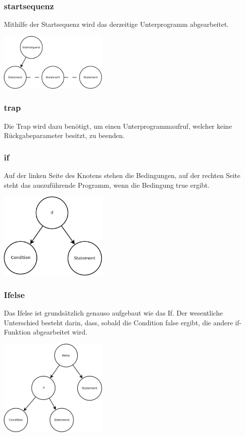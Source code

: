 \subsubsection{startsequenz}
Mithilfe der Startsequenz wird das derzeitige Unterprogramm abgearbeitet.

\includegraphics[width=0.4\textwidth]{./media/images/interpreter/syntaxbaum/statements/startsequenz.png}

\subsubsection{trap}
Die Trap wird dazu benötigt, um einen Unterprogrammaufruf, welcher keine Rückgabeparameter besitzt, zu beenden.

\subsubsection{if}
Auf der linken Seite des Knotens stehen die Bedingungen, auf der rechten Seite steht das auszuführende Programm, wenn die Bedingung
true ergibt.

\includegraphics[width=0.4\textwidth]{./media/images/interpreter/syntaxbaum/statements/if.png}

\subsubsection{Ifelse}
Das Ifelse ist grundsätzlich genauso aufgebaut wie das If. Der wesentliche Unterschied besteht darin, dass, sobald die Condition
false ergibt, die andere if-Funktion abgearbeitet wird.

\includegraphics[width=0.4\textwidth]{./media/images/interpreter/syntaxbaum/statements/ifelse.png}

